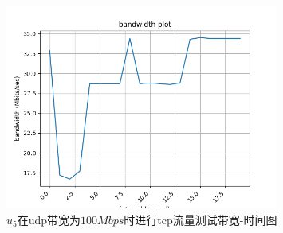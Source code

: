 \begin{figure}[h]
	\centering
	\includegraphics[width=0.8\textwidth]{image/u5-100.tcp.png}
	\caption{$u_5$在udp带宽为$100Mbps$时进行tcp流量测试带宽-时间图}
 	\label{fig:u5100}
\end{figure}